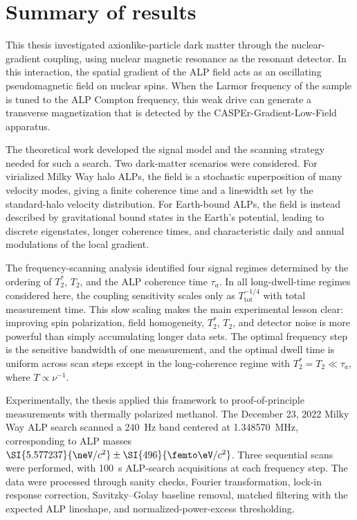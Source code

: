 \section{Summary of results}

This thesis investigated axionlike-particle dark matter through the nuclear-gradient coupling, using nuclear magnetic resonance as the resonant detector.
In this interaction, the spatial gradient of the ALP field acts as an oscillating pseudomagnetic field on nuclear spins.
When the Larmor frequency of the sample is tuned to the ALP Compton frequency, this weak drive can generate a transverse magnetization that is detected by the CASPEr-Gradient-Low-Field apparatus.

The theoretical work developed the signal model and the scanning strategy needed for such a search.
Two dark-matter scenarios were considered.
For virialized Milky Way halo ALPs, the field is a stochastic superposition of many velocity modes, giving a finite coherence time and a linewidth set by the standard-halo velocity distribution.
For Earth-bound ALPs, the field is instead described by gravitational bound states in the Earth's potential, leading to discrete eigenstates, longer coherence times, and characteristic daily and annual modulations of the local gradient.

The frequency-scanning analysis identified four signal regimes determined by the ordering of $T_2^*$, $T_2$, and the ALP coherence time $\tau_a$.
In all long-dwell-time regimes considered here, the coupling sensitivity scales only as $T_\mathrm{tot}^{-1/4}$ with total measurement time.
This slow scaling makes the main experimental lesson clear: improving spin polarization, field homogeneity, $T_2^*$, $T_2$, and detector noise is more powerful than simply accumulating longer data sets.
The optimal frequency step is the sensitive bandwidth of one measurement, and the optimal dwell time is uniform across scan steps except in the long-coherence regime with $T_2^*=T_2\ll\tau_a$, where $T\propto\nu^{-1}$.

Experimentally, the thesis applied this framework to proof-of-principle measurements with thermally polarized methanol.
The December 23, 2022 Milky Way ALP search scanned a \SI{240}{\Hz} band centered at \SI{1.348570}{\MHz}, corresponding to ALP masses
$\SI{5.577237}{\neV/c^2}\pm\SI{496}{\femto\eV/c^2}$.
Three sequential scans were performed, with \SI{100}{\s} ALP-search acquisitions at each frequency step.
The data were processed through sanity checks, Fourier transformation, lock-in response correction, Savitzky--Golay baseline removal, matched filtering with the expected ALP lineshape, and normalized-power-excess thresholding.

